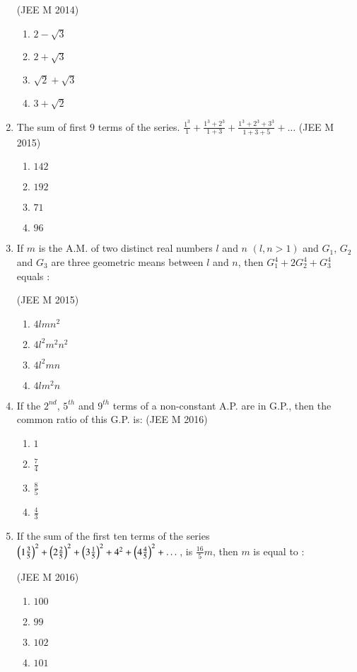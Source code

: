 \documentclass[journal,12pt,twocolumn]{IEEEtran}
\theoremstyle{remark}
\begin{document}
\begin{enumerate}
    \hfill(JEE M 2014)
    \begin{enumerate}
    \item$2-\sqrt{3}$
    \item$2+\sqrt{3}$
    \item$\sqrt{2}+\sqrt{3}$
    \item$3+\sqrt{2}$ 
    \end{enumerate}
    \item The sum of first $9$ terms of the series.
	    $\frac{1^3}{1}+\frac{1^3+2^3}{1+3}+\frac{1^3+2^3+3^3}{1+3+5}+\dots$
    \hfill(JEE M 2015)
    \begin{enumerate}
    \item $142$
    \item $192$
    \item $71$
    \item $96$
    \end{enumerate}
    \item If $m$ is the A.M. of two distinct real numbers $l$ and $n$ $(l,n>1)$ and $G_1$, $G_2$ and $G_3$ are three geometric means between $l$ and $n$, then $G_1^4+2G_2^4+G_3^4$ equals :
    
    \hfill(JEE M 2015)
    \begin{enumerate}
    \item$4lmn^2$
    \item$4l^2m^2n^2$
    \item$4l^2mn$
    \item$4lm^2n$ 
    \end{enumerate}
    \item If the $2^{nd}$, $5^{th}$ and $9^{th}$ terms of a non-constant A.P. are in G.P., then the common ratio of this G.P. is:
    \hfill(JEE M 2016)
    \begin{enumerate}
    \item $1$
    \item $\frac{7}{4}$
    \item $\frac{8}{5}$
    \item $\frac{4}{3}$
    \end{enumerate}
    \item If the sum of the first ten terms of the series $\left(1\frac{3}{5}\right)^2+\left(2\frac{2}{5}\right)^2+\left(3\frac{1}{5}\right)^2+4^2+\left(4\frac{4}{5}\right)^2+\dots$, is $\frac{16}{5}m$, then $m$ is equal to :
    
    \hfill(JEE M 2016)
    \begin{enumerate}
    \item$100$
    \item$99$
    \item$102$
    \item$101$
    \end{enumerate}
\end{enumerate}
\end{document}
